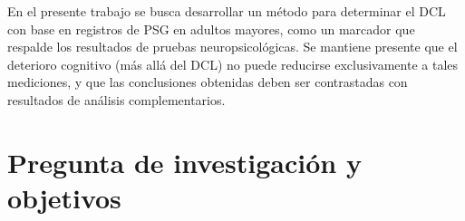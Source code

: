 \documentclass[12pt,letterpaper]{book}
\begin{document}



%





En el presente trabajo se busca desarrollar un método para determinar el DCL con base en registros de PSG en adultos mayores, como un marcador que respalde los resultados de pruebas neuropsicológicas.
%
Se mantiene presente que el deterioro cognitivo (más allá del DCL) no puede reducirse exclusivamente a tales mediciones, y que las conclusiones obtenidas 
deben ser contrastadas con resultados de análisis complementarios.


\section*{Pregunta de investigación y objetivos}
\end{document}
